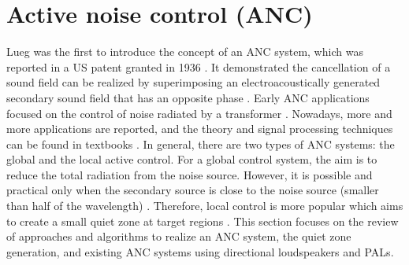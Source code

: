 

\section{Active noise control (ANC)}
\label{sec:review_anc}

Lueg {was the first to introduce} the concept of an ANC system{, which was reported} in a US patent granted in 1936 \cite{Lueg1936ProcessSilencingSound}.
It demonstrated the cancellation of a sound field can be realized by superimposing an electroacoustically generated secondary sound field that has an opposite phase \cite{Lueg1936ProcessSilencingSound, Guicking1990InventionActiveNoise}.
Early ANC applications focused on the control of noise radiated by a transformer \cite{Ross1978ExperimentsActiveControl}.
Nowadays, more and more applications are reported, and the theory and signal processing techniques can be found in textbooks \cite{Nelson1992ActiveControlSound, Fuller1996ActiveControlVibration, Elliott2000SignalProcessingActive, Hansen2012ActiveControlNoise, Kuo1996ActiveNoiseControl}.
In general, there are two types of ANC systems: the global and the local active control.
For a global control system, the aim is to reduce the total radiation from the noise source.
However, it is possible and practical only when the secondary source is close to the noise source (smaller than half of the wavelength) \cite{Nelson1992ActiveControlSound}.
Therefore, local control is more popular which aims to create a small quiet zone at target regions \cite{Joseph1994FieldZonesQuiet}.
This section focuses on the review of {approaches and algorithms to realize an ANC system}, the quiet zone generation, and existing ANC systems using directional loudspeakers and PALs.

